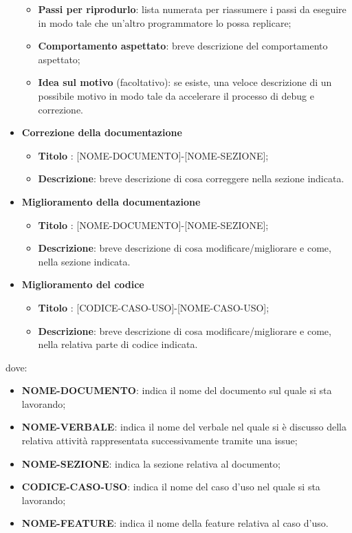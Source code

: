 \begin{itemize}
\begin{itemize}
              \item \textbf{Passi per riprodurlo}: lista numerata per riassumere i passi da eseguire in modo tale che un'altro programmatore lo possa replicare;
              \item \textbf{Comportamento aspettato}: breve descrizione del comportamento aspettato;
              \item \textbf{Idea sul motivo} (facoltativo): se esiste, una veloce descrizione di un possibile motivo in modo tale da accelerare il processo di debug e correzione.
          \end{itemize}
    \item  \textbf{Correzione della documentazione}
          \begin{itemize}
              \item \textbf{Titolo} : [NOME-DOCUMENTO]-[NOME-SEZIONE];
              \item \textbf{Descrizione}: breve descrizione di cosa correggere nella sezione indicata.
          \end{itemize}
    \item  \textbf{Miglioramento della documentazione}
          \begin{itemize}
              \item \textbf{Titolo} : [NOME-DOCUMENTO]-[NOME-SEZIONE];
              \item \textbf{Descrizione}: breve descrizione di cosa modificare/migliorare e come, nella sezione indicata.
          \end{itemize}
    \item  \textbf{Miglioramento del codice}
          \begin{itemize}
              \item \textbf{Titolo} : [CODICE-CASO-USO]-[NOME-CASO-USO];
              \item \textbf{Descrizione}: breve descrizione di cosa modificare/migliorare e come, nella relativa parte di codice indicata.
          \end{itemize}
\end{itemize}
dove:

\begin{itemize}
    \item \textbf{NOME-DOCUMENTO}: indica il nome del documento sul quale si sta lavorando;
    \item \textbf{NOME-VERBALE}: indica il nome del verbale nel quale si è discusso della relativa attività rappresentata successivamente tramite una issue;
    \item \textbf{NOME-SEZIONE}: indica la sezione relativa al documento;
    \item \textbf{CODICE-CASO-USO}: indica il nome del caso d'uso nel quale si sta lavorando;
    \item \textbf{NOME-FEATURE}: indica il nome della feature relativa al caso d'uso.
\end{itemize}

